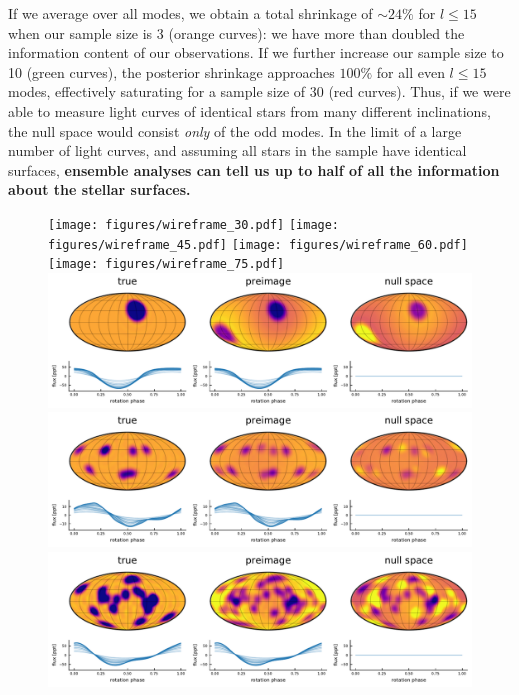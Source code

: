 \documentclass[modern]{aastex62}
\begin{document}
If we average over all modes, we obtain a total shrinkage of $\sim 24\%$
for $l\leq15$ when our sample size is 3 (orange curves): we have more than doubled the
information content of our observations. If we further increase our sample size
to 10 (green curves), the posterior shrinkage approaches $100\%$ for all even $l\leq15$
modes, effectively saturating for a sample size of 30 (red curves).
Thus, if we were able to measure light curves of identical stars
from many different inclinations, the null space would consist \emph{only}
of the odd modes. In the limit of a large number of light curves,
and assuming all stars in the sample have identical surfaces,
\textbf{ensemble analyses can tell us up to
    half of all the information about the stellar surfaces.}

\begin{figure}[p!]
    \begin{centering}
        \vspace{-4em}
        \texttt{[image: figures/wireframe\_30.pdf]}
        \texttt{[image: figures/wireframe\_45.pdf]}
        \texttt{[image: figures/wireframe\_60.pdf]}
        \texttt{[image: figures/wireframe\_75.pdf]}
        \\[0.5em]
        \includegraphics[width=\linewidth]{figures/nullspace_preimage_a.pdf}
        \\[1em]
        \includegraphics[width=\linewidth]{figures/nullspace_preimage_b.pdf}
        \\[1em]
        \includegraphics[width=\linewidth]{figures/nullspace_preimage_c.pdf}

\end{centering}
\end{figure}
\end{document}
